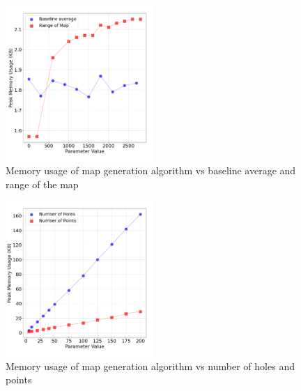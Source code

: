 \documentclass[final]{cmpreport_02}
\begin{document}
\begin{figure}[h!]
	\centering
	\includegraphics[width=0.5\textwidth]{./images/mapGenBaselneRangeMem.png}
	\caption{Memory usage of map generation algorithm vs baseline average and range of the map}
	\label{PE:mg:memBaselineRange}
\end{figure}

\begin{figure}[h!]
	\centering
	\includegraphics[width=0.5\textwidth]{./images/mapGenPointsHolesMem.png}
	\caption{Memory usage of map generation algorithm vs number of holes and points}
	\label{PE:mg:memHolesPoints}
\end{figure}

%
%
%
%
\end{document}
